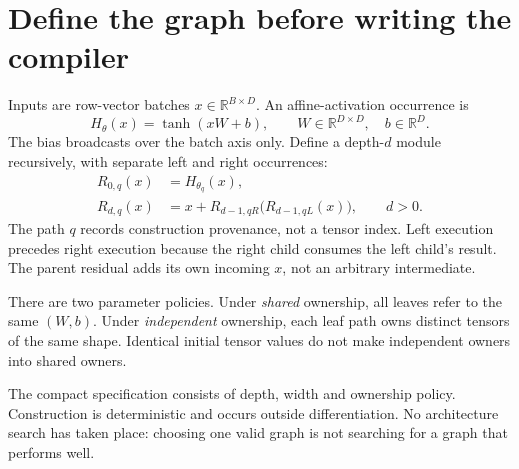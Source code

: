 \section{Define the graph before writing the compiler}
Inputs are row-vector batches $x\in\mathbb R^{B\times D}$.
An affine-activation occurrence is
\begin{equation}
 H_\theta(x)=\tanh(xW+b),\qquad
 W\in\mathbb R^{D\times D},\quad b\in\mathbb R^D.
\end{equation}
The bias broadcasts over the batch axis only. Define a depth-$d$ module
recursively, with separate left and right occurrences:
\begin{align}
 R_{0,q}(x)&=H_{\theta_q}(x),\\
 R_{d,q}(x)&=x+R_{d-1,qR}\bigl(R_{d-1,qL}(x)\bigr),\qquad d>0.
\end{align}
The path $q$ records construction provenance, not a tensor index. Left
execution precedes right execution because the right child consumes the
left child's result. The parent residual adds its own incoming $x$,
not an arbitrary intermediate.

There are two parameter policies. Under \emph{shared} ownership, all leaves
refer to the same $(W,b)$. Under \emph{independent} ownership, each leaf path
owns distinct tensors of the same shape. Identical initial tensor values
do not make independent owners into shared owners.

The compact specification consists of depth, width and ownership policy.
Construction is deterministic and occurs outside differentiation.
No architecture search has taken place: choosing one valid graph is not
searching for a graph that performs well.

